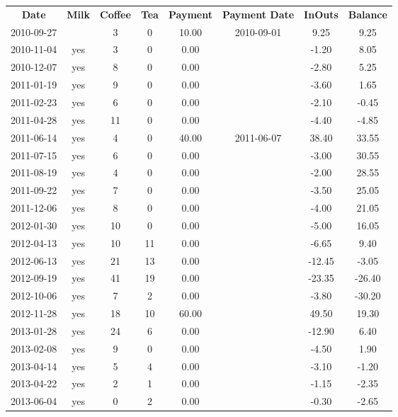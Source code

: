 \begin{center}
\begin{tabular}{cccccccc}
\textbf{Date} & \textbf{Milk} & \textbf{Coffee} & \textbf{Tea} & \textbf{Payment} & \textbf{Payment Date} & \textbf{InOuts} & \textbf{Balance} \\
2010-09-27 &  &  3 &  0 & 10.00 & 2010-09-01 &   9.25 &   9.25\\ 
2010-11-04 & yes &  3 &  0 &  0.00 &  &  -1.20 &   8.05\\ 
2010-12-07 & yes &  8 &  0 &  0.00 &  &  -2.80 &   5.25\\ 
2011-01-19 & yes &  9 &  0 &  0.00 &  &  -3.60 &   1.65\\ 
2011-02-23 & yes &  6 &  0 &  0.00 &  &  -2.10 &  -0.45\\ 
2011-04-28 & yes & 11 &  0 &  0.00 &  &  -4.40 &  -4.85\\ 
2011-06-14 & yes &  4 &  0 & 40.00 & 2011-06-07 &  38.40 &  33.55\\ 
2011-07-15 & yes &  6 &  0 &  0.00 &  &  -3.00 &  30.55\\ 
2011-08-19 & yes &  4 &  0 &  0.00 &  &  -2.00 &  28.55\\ 
2011-09-22 & yes &  7 &  0 &  0.00 &  &  -3.50 &  25.05\\ 
2011-12-06 & yes &  8 &  0 &  0.00 &  &  -4.00 &  21.05\\ 
2012-01-30 & yes & 10 &  0 &  0.00 &  &  -5.00 &  16.05\\ 
2012-04-13 & yes & 10 & 11 &  0.00 &  &  -6.65 &   9.40\\ 
2012-06-13 & yes & 21 & 13 &  0.00 &  & -12.45 &  -3.05\\ 
2012-09-19 & yes & 41 & 19 &  0.00 &  & -23.35 & -26.40\\ 
2012-10-06 & yes &  7 &  2 &  0.00 &  &  -3.80 & -30.20\\ 
2012-11-28 & yes & 18 & 10 & 60.00 &  &  49.50 &  19.30\\ 
2013-01-28 & yes & 24 &  6 &  0.00 &  & -12.90 &   6.40\\ 
2013-02-08 & yes &  9 &  0 &  0.00 &  &  -4.50 &   1.90\\ 
2013-04-14 & yes &  5 &  4 &  0.00 &  &  -3.10 &  -1.20\\ 
2013-04-22 & yes &  2 &  1 &  0.00 &  &  -1.15 &  -2.35\\ 
2013-06-04 & yes &  0 &  2 &  0.00 &  &  -0.30 &  -2.65
\end{tabular}
\end{center}

